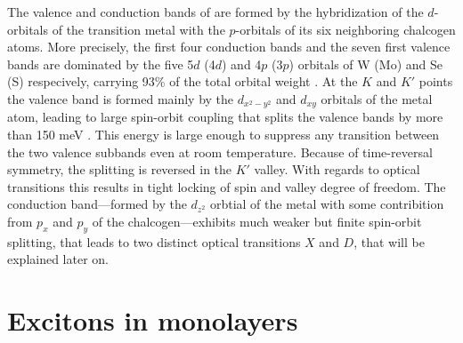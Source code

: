 The valence and conduction bands of \tmds are formed by the hybridization of the $d$-orbitals of the transition metal with the $p$-orbitals of its six neighboring chalcogen atoms. More precisely, the first four conduction bands and the seven first valence bands are dominated by the five 5$d$ (4$d$) and 4$p$ (3$p$) orbitals of W (Mo) and Se (S) respecively, carrying 93\% of the total orbital weight \cite{cappelluti_tight-binding_2013,silva-guillen_electronic_2016}. At the $K$ and $K'$ points the valence band is formed mainly by the $d_{x^2-y^2}$ and $d_{xy}$ orbitals of the metal atom, leading to large spin-orbit coupling that splits the valence bands by more than 150 meV  \cite{zhu_giant_2011}. This energy is large enough to suppress any transition between the two valence subbands even at room temperature. Because of time-reversal symmetry, the splitting is reversed in the $K'$ valley. With regards to optical transitions this results in tight locking of spin and valley degree of freedom. The conduction band---formed by the $d_{z^2}$ orbtial of the metal with some contribition from $p_x$ and $p_y$ of the chalcogen---exhibits much weaker but finite spin-orbit splitting, that leads to two distinct optical transitions $X$ and $D$, that will be explained later on.

\section{Excitons in \tmdg monolayers}\label{theory_exciton}

